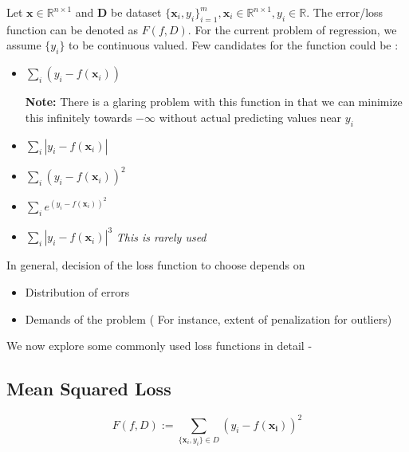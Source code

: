 \documentclass[12pt]{article}
\begin{document}
Let $\boldsymbol{x} \in \mathbb{R}^{n \times 1}$ and \textbf{D} be dataset $\{\boldsymbol{x}_i, y_i\}_{i=1}^m, \boldsymbol{x}_i \in \mathbb{R}^{n \times 1}, y_i \in \mathbb{R}$. The error/loss function can be denoted as $F(f,D)$. For the current problem of regression, we assume $\{y_i\}$ to be continuous valued.  Few candidates for the function could be :

\begin{itemize}
    \item $\sum_i \left(  y_i - f\left(\boldsymbol{x}_i\right) \right)$ 
    
    \textbf{Note: } There is a glaring problem with this function in that we can minimize this infinitely towards $-\infty$ without actual predicting values near $y_i$  
    \item  $\sum_i \left| y_i - f\left(\boldsymbol{x}_i\right) \right|$
    \item  $\sum_i \left(  y_i - f\left(\boldsymbol{x}_i\right) \right)^2$
    \item  $\sum_i e^{\left(  y_i - f\left(\boldsymbol{x}_i\right) \right)^2}$
    \item  $\sum_i \left|  y_i - f\left(\boldsymbol{x}_i\right) \right|^3$ \hspace{5pt} \textit{This is rarely used}
    
\end{itemize}


In general, decision of the loss function to choose depends on  

\begin{itemize}
    \item Distribution of errors
    \item Demands of the problem ( For instance,  extent of penalization for outliers)
\end{itemize}

We now explore some commonly used loss functions in detail - 

\subsection*{Mean Squared Loss}

$$F(f, D) := \sum_{ \{\boldsymbol{x}_i, y_i\} \in D}(y_i - f(\boldsymbol{x_i}))^2$$
\end{document}
